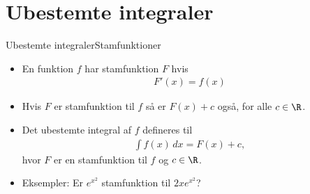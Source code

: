 \section{Ubestemte integraler}
\begin{frame}{Ubestemte integraler}{Stamfunktioner}
\begin{itemize}
	\setlength\itemsep{1em}
	\item<1-> En funktion $f$ har stamfunktion $F$ hvis
	\begin{align*}
	F'(x)=f(x)
	\end{align*}
	\item<2-> Hvis $F$ er stamfunktion til $f$ så er $F(x)+c$ også, for alle $c\in \R$.
	\item<3-> Det ubestemte integral af $f$ defineres til
	\begin{align*}
	\int f(x)\, dx =F(x)+c,
	\end{align*}
	hvor $F$ er en stamfunktion til $f$ og $c\in \R$.
	\item<4-> Eksempler: Er $e^{x^2}$ stamfunktion til $2xe^{x^2}$?
\end{itemize}
\end{frame}

